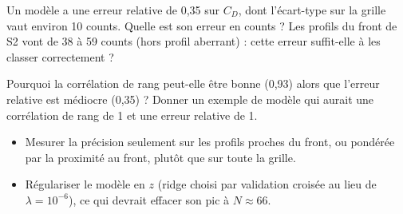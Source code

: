 \exercices
\begin{exercice}\label{ex:prec-lecture}
Un modèle a une erreur relative de 0,35 sur $C_D$, dont l'écart-type sur la grille vaut environ 10 counts. Quelle est son erreur en counts ? Les profils du front de S2 vont de 38 à 59 counts (hors profil aberrant) : cette erreur suffit-elle à les classer correctement ?
\end{exercice}
\begin{exercice}\label{ex:prec-rang}
Pourquoi la corrélation de rang peut-elle être bonne (0,93) alors que l'erreur relative est médiocre (0,35) ? Donner un exemple de modèle qui aurait une corrélation de rang de 1 et une erreur relative de 1.
\end{exercice}

\begin{pistes}
\begin{itemize}
\item Mesurer la précision seulement sur les profils proches du front, ou pondérée par la proximité au front, plutôt que sur toute la grille.
\item Régulariser le modèle en $z$ (ridge choisi par validation croisée au lieu de $\lambda=10^{-6}$), ce qui devrait effacer son pic à $N\approx66$.
\end{itemize}
\end{pistes}
